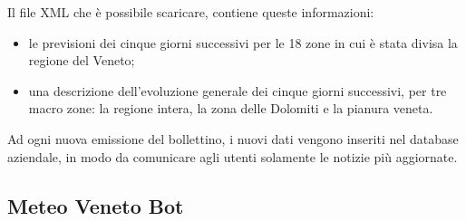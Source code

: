 Il file \gls{XML} che è possibile scaricare, contiene queste informazioni:
\begin{itemize}
	\item le previsioni dei cinque giorni successivi per le 18 zone in cui è stata divisa la regione del Veneto;
	\item una descrizione dell'evoluzione generale dei cinque giorni successivi, per tre macro zone: la regione intera, la zona delle Dolomiti e la pianura veneta.
\end{itemize}

Ad ogni nuova emissione del bollettino, i nuovi dati vengono inseriti nel database aziendale, in modo da comunicare agli utenti solamente le notizie più aggiornate.

\subsection{Meteo Veneto Bot}
